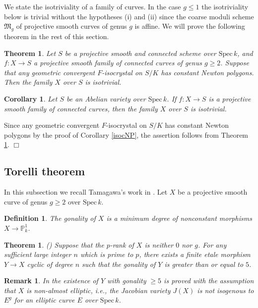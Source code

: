 \documentclass[11pt]{amsart}
\newtheorem{theorem}[Lemma]{Theorem}
\newtheorem{corollary}[Lemma]{Corollary}
\newtheorem{definition}[Lemma]{Definition}
\newtheorem{remark}[Lemma]{Remark}
\begin{document}
We state the isotriviality of a family of curves. In the case $g \leq 1$ the isotriviality 
below is trivial without the hypotheses (i) and (ii) since the coarse moduli scheme $\mathfrak M_g$ 
of projective smooth curves of genus $g$ is affine. 
We will prove the following theorem in the rest of this section. 

\begin{theorem}\label{isotcNP} Let $S$ be 
a projective smooth and connected scheme over $\mathrm{Spec}\, k$, 
and $f : X \rightarrow S$ a projective smooth family of connected curves of genus $g \geq 2$. 
Suppose that any geometric convergent $F$-isocrystal on $S/K$ 
has constant Newton polygons. 
Then the family $X$ over $S$ is isotrivial. 
\end{theorem}

\begin{corollary}\label{isotab} Let $S$ be an Abelian variety over $\mathrm{Spec}\, k$.
If $f : X \rightarrow S$ is a projective smooth family of connected curves, 
then the family $X$ over $S$ is isotrivial. 
\end{corollary}

{ {Since any geometric convergent $F$-isocrystal on $S/K$ has 
constant Newton polygons by the proof of Corollary \ref{isocNP}, 
the assertion follows from Theorem \ref{isotcNP}. 
} \hspace*{\fill} $\Box$}

\subsection{Torelli theorem} 
In this subsection we recall Tamagawa's work in \cite{tam}. 
Let $X$ be a projective smooth curve of genus $g \geq 2$ 
over $\mathrm{Spec}\, k$. 

\begin{definition}\label{gon} The gonality of $X$ is a minimum degree of 
nonconstant morphisms $X \rightarrow \mathbb P^1_k$. 
\end{definition}

\begin{theorem}\label{exon} \mbox{\rm (\cite[Proposition 2.14]{tam})} Suppose that 
the $p$-rank of $X$ is neither $0$ nor $g$. For any sufficient large integer $n$ which is prime to $p$, 
there exists a finite etale morphism $Y \rightarrow X$ cyclic of degree $n$ 
such that the gonality of $Y$ is greater than or equal to $5$. 
\end{theorem}

\begin{remark} In \cite[Proposition 2.14]{tam} the existence of $Y$ with gonality $\geq 5$ 
is proved with the assumption that $X$ is non-almost elliptic, i.e., the Jacobian variety 
$J(X)$ is not isogenous to $E^g$ for an elliptic curve $E$ over $\mathrm{Spec}\, k$. 
\end{remark}
\end{document}

